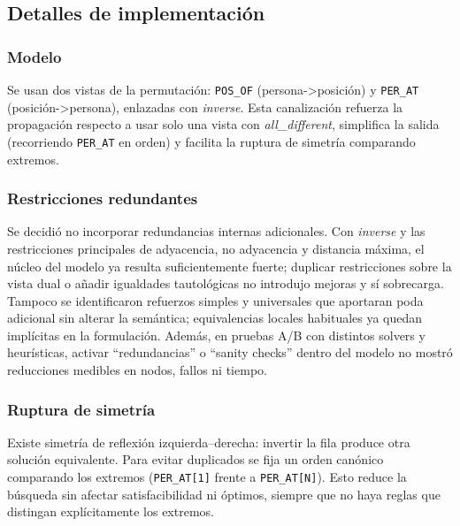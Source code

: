 
\subsection{Detalles de implementación}\label{sec:05-reunion-impl}

\subsubsection*{Modelo}
Se usan dos vistas de la permutación: \texttt{POS\_OF} (persona->posición) y \texttt{PER\_AT} (posición->persona), enlazadas con \textit{inverse}. Esta canalización refuerza la propagación respecto a usar solo una vista con \textit{all\_different}, simplifica la salida (recorriendo \texttt{PER\_AT} en orden) y facilita la ruptura de simetría comparando extremos.

\subsubsection*{Restricciones redundantes}
Se decidió no incorporar redundancias internas adicionales. Con \textit{inverse} y las restricciones principales de adyacencia, no adyacencia y distancia máxima, el núcleo del modelo ya resulta suficientemente fuerte; duplicar restricciones sobre la vista dual o añadir igualdades tautológicas no introdujo mejoras y sí sobrecarga. Tampoco se identificaron refuerzos simples y universales que aportaran poda adicional sin alterar la semántica; equivalencias locales habituales ya quedan implícitas en la formulación. Además, en pruebas A/B con distintos solvers y heurísticas, activar “redundancias” o “sanity checks” dentro del modelo no mostró reducciones medibles en nodos, fallos ni tiempo.

\subsubsection*{Ruptura de simetría}
Existe simetría de reflexión izquierda–derecha: invertir la fila produce otra solución equivalente. Para evitar duplicados se fija un orden canónico comparando los extremos (\texttt{PER\_AT[1]} frente a \texttt{PER\_AT[N]}). Esto reduce la búsqueda sin afectar satisfacibilidad ni óptimos, siempre que no haya reglas que distingan explícitamente los extremos.
